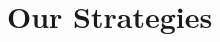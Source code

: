 \documentclass[aspectratio=169,usenames,dvipsnames]{beamer}
\begin{document}
%



\section{\bf Our Strategies}
\end{document}
